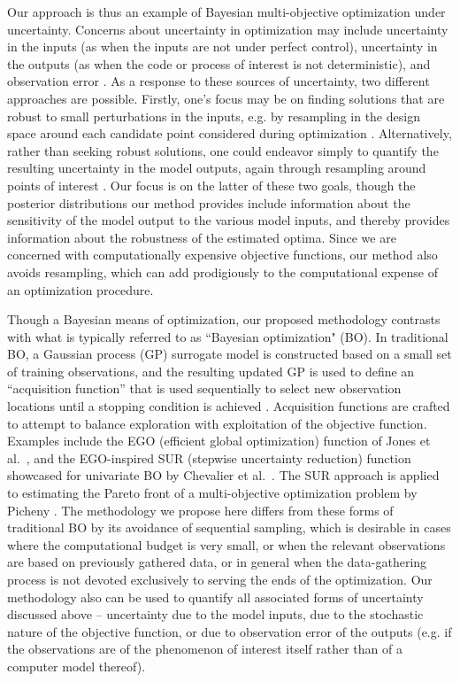 \documentclass[twocolumn,10pt]{asme2ej}
\begin{document}
Our approach is thus an example of Bayesian multi-objective optimization under uncertainty. Concerns about uncertainty in optimization may include uncertainty in the inputs (as when the inputs are not under perfect control), uncertainty in the outputs (as when the code or process of interest is not deterministic), and observation error \cite{Jin2005}. 
%
As a response to these sources of uncertainty, two different approaches are possible.
%
Firstly, one's focus may be on finding solutions that are robust to small perturbations in the inputs, e.g. by resampling in the design space around each candidate point considered during optimization \cite{Deb2006}.
%
Alternatively, rather than seeking robust solutions, one could endeavor simply to quantify the resulting uncertainty in the model outputs, again through resampling around points of interest \cite{Zhou2011}.
%
Our focus is on the latter of these two goals, though the posterior distributions our method provides include information about the sensitivity of the model output to the various model inputs, and thereby provides information about the robustness of the estimated optima.
%
Since we are concerned with computationally expensive objective functions, our method also avoids resampling, which can add prodigiously to the computational expense of an optimization procedure.
%

%
Though a Bayesian means of optimization, our proposed methodology contrasts with what is typically referred to as ``Bayesian optimization" (BO). 
%
In traditional BO, a Gaussian process (GP) surrogate model is constructed based on a small set of training observations, and the resulting updated GP is used to define an ``acquisition function'' that is used sequentially to select new observation locations until a stopping condition is achieved \cite{Picheny2019}.
%
Acquisition functions are crafted to attempt to balance exploration with exploitation of the objective function.
%
Examples include the EGO (efficient global optimization) function of Jones et al.\ \cite{Jones1998}, and the EGO-inspired SUR (stepwise uncertainty reduction) function showcased for univariate BO by Chevalier et al.\ \cite{Chevalier2014}.
%
The SUR approach is applied to estimating the Pareto front of a multi-objective optimization problem by Picheny \cite{Picheny2015}.
%
The methodology we propose here differs from these forms of traditional BO by its avoidance of sequential sampling, which is desirable in cases where the computational budget is very small, or when the relevant observations are based on previously gathered data, or in general when the data-gathering process is not devoted exclusively to serving the ends of the optimization.
%
Our methodology also can be used to quantify all associated forms of uncertainty discussed above -- uncertainty due to the model inputs, due to the stochastic nature of the objective function, or due to observation error of the outputs (e.g. if the observations are of the phenomenon of interest itself rather than of a computer model thereof).
%
\end{document}

